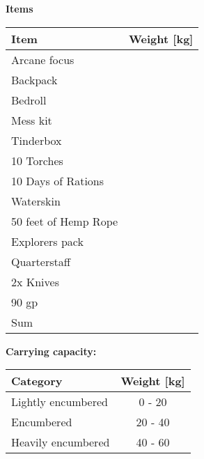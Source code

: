 \documentclass[11pt]{article}
\begin{document}
	\begin{center}
{\LARGE \textbf{Items}}
	\end{center}

	\begin{tabularx}{\textwidth}{X|r}
Item & Weight [kg] \\
\hline
Arcane focus								&			\\
Backpack									&			\\
Bedroll										&			\\
Mess kit									&			\\
Tinderbox									&			\\
10 Torches									&			\\
10 Days of Rations							&			\\
Waterskin									&			\\
50 feet of Hemp Rope						&			\\
Explorers pack								&			\\
Quarterstaff								&			\\
2x Knives									&			\\
90 gp 										& 			\\
\hline
Sum 										& 			\\
	\end{tabularx}

\vspace{10mm}

\textbf{Carrying capacity:} \\

	\begin{tabular}{l|c}
Category & Weight [kg] \\
\hline
Lightly encumbered 	& 0 - 20 	\\
Encumbered 			& 20 - 40	\\
Heavily encumbered	& 40 - 60	\\
	\end{tabular}
\end{document}

